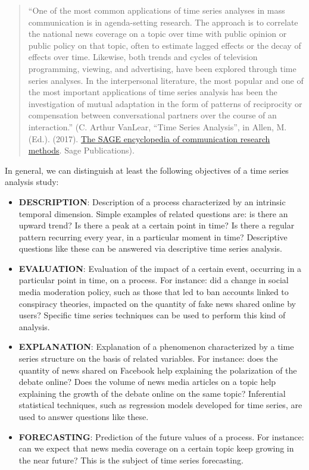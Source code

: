 \documentclass[
]{article}
\providecommand{\tightlist}{%
  \setlength{\itemsep}{0pt}\setlength{\parskip}{0pt}}
\begin{document}
\begin{quote}
``One of the most common applications of time series analyses in mass communication is in agenda-setting research. The approach is to correlate the national news coverage on a topic over time with public opinion or public policy on that topic, often to estimate lagged effects or the decay of effects over time. Likewise, both trends and cycles of television programming, viewing, and advertising, have been explored through time series analyses. In the interpersonal literature, the most popular and one of the most important applications of time series analysis has been the investigation of mutual adaptation in the form of patterns of reciprocity or compensation between conversational partners over the course of an interaction.'' (C. Arthur VanLear, ``Time Series Analysis'', in Allen, M. (Ed.). (2017). \href{https://us.sagepub.com/en-us/nam/the-sage-encyclopedia-of-communication-research-methods/book244974}{The SAGE encyclopedia of communication research methods}. Sage Publications).
\end{quote}

In general, we can distinguish at least the following objectives of a time series analysis study:

\begin{itemize}
\tightlist
\item
  \textbf{DESCRIPTION}: Description of a process characterized by an intrinsic temporal dimension. Simple examples of related questions are: is there an upward trend? Is there a peak at a certain point in time? Is there a regular pattern recurring every year, in a particular moment in time? Descriptive questions like these can be answered via descriptive time series analysis.
\item
  \textbf{EVALUATION}: Evaluation of the impact of a certain event, occurring in a particular point in time, on a process. For instance: did a change in social media moderation policy, such as those that led to ban accounts linked to conspiracy theories, impacted on the quantity of fake news shared online by users? Specific time series techniques can be used to perform this kind of analysis.
\item
  \textbf{EXPLANATION}: Explanation of a phenomenon characterized by a time series structure on the basis of related variables. For instance: does the quantity of news shared on Facebook help explaining the polarization of the debate online? Does the volume of news media articles on a topic help explaining the growth of the debate online on the same topic? Inferential statistical techniques, such as regression models developed for time series, are used to answer questions like these.
\item
  \textbf{FORECASTING}: Prediction of the future values of a process. For instance: can we expect that news media coverage on a certain topic keep growing in the near future? This is the subject of time series forecasting.
\end{itemize}
\end{document}
